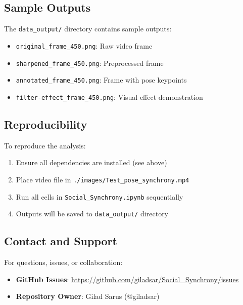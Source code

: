 \documentclass[11pt]{article}
\begin{document}
\subsection{Sample Outputs}
The \texttt{data\_output/} directory contains sample outputs:
\begin{itemize}
    \item \texttt{original\_frame\_450.png}: Raw video frame
    \item \texttt{sharpened\_frame\_450.png}: Preprocessed frame
    \item \texttt{annotated\_frame\_450.png}: Frame with pose keypoints
    \item \texttt{filter-effect\_frame\_450.png}: Visual effect demonstration
\end{itemize}

\subsection{Reproducibility}
To reproduce the analysis:
\begin{enumerate}
    \item Ensure all dependencies are installed (see above)
    \item Place video file in \texttt{./images/Test\_pose\_synchrony.mp4}
    \item Run all cells in \texttt{Social\_Synchrony.ipynb} sequentially
    \item Outputs will be saved to \texttt{data\_output/} directory
\end{enumerate}

\subsection{Contact and Support}
For questions, issues, or collaboration:
\begin{itemize}
    \item \textbf{GitHub Issues}: \url{https://github.com/giladsar/Social_Synchrony/issues}
    \item \textbf{Repository Owner}: Gilad Sarus (@giladsar)
\end{itemize}
\end{document}
